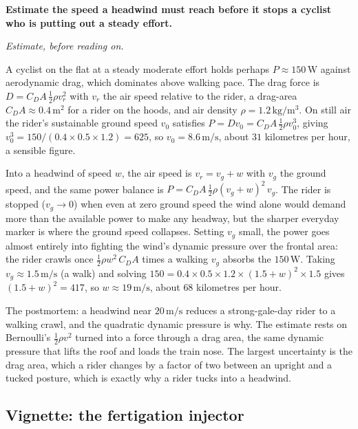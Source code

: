 \begin{estimation}
\textbf{Estimate the speed a headwind must reach before it stops a
cyclist who is putting out a steady effort.}

\smallskip
\textit{Estimate, before reading on.}

\smallskip
A cyclist on the flat at a steady moderate effort holds perhaps $P
\approx 150\,\si{\watt}$ against aerodynamic drag, which dominates
above walking pace. The drag force is $D = C_D A\,\tfrac12\rho v_r^2$
with $v_r$ the air speed relative to the rider, a drag-area $C_D A
\approx 0.4\,\si{\meter}^2$ for a rider on the hoods, and air density
$\rho = 1.2\,\si{\kilogram\per\meter\cubed}$. On still air the rider's
sustainable ground speed $v_0$ satisfies $P = D v_0 = C_D A\,\tfrac12
\rho v_0^3$, giving $v_0^3 = 150/(0.4\times 0.5\times 1.2) = 625$, so
$v_0 = 8.6\,\si{\meter\per\second}$, about $31$ kilometres per hour, a
sensible figure.

Into a headwind of speed $w$, the air speed is $v_r = v_g + w$ with
$v_g$ the ground speed, and the same power balance is $P = C_D A\,
\tfrac12\rho(v_g + w)^2\,v_g$. The rider is stopped ($v_g \to 0$) when
even at zero ground speed the wind alone would demand more than the
available power to make any headway, but the sharper everyday marker is
where the ground speed collapses. Setting $v_g$ small, the power goes
almost entirely into fighting the wind's dynamic pressure over the
frontal area: the rider crawls once $\tfrac12\rho w^2\,C_D A$ times a
walking $v_g$ absorbs the $150\,\si{\watt}$. Taking $v_g \approx
1.5\,\si{\meter\per\second}$ (a walk) and solving $150 = 0.4\times 0.5
\times 1.2\times(1.5 + w)^2\times 1.5$ gives $(1.5 + w)^2 = 417$, so
$w \approx 19\,\si{\meter\per\second}$, about $68$ kilometres per hour.

\smallskip
The postmortem: a headwind near $20\,\si{\meter\per\second}$ reduces a
strong-gale-day rider to a walking crawl, and the quadratic dynamic
pressure is why. The estimate rests on Bernoulli's $\tfrac12\rho v^2$
turned into a force through a drag area, the same dynamic pressure that
lifts the roof and loads the train nose. The largest uncertainty is
the drag area, which a rider changes by a factor of two between an
upright and a tucked posture, which is exactly why a rider tucks into
a headwind.
\end{estimation}

\subsection{Vignette: the fertigation injector}

